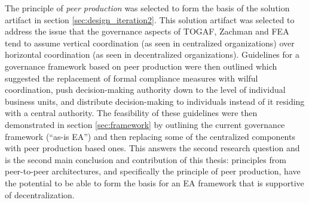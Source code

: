 The principle of \textit{peer production} was selected to form the basis of the solution artifact in section \ref{sec:design_iteration2}. This solution artifact was selected to address the issue that the governance aspects of TOGAF, Zachman and FEA tend to assume vertical coordination (as seen in centralized organizations) over horizontal coordination (as seen in decentralized organizations). Guidelines for a governance framework based on peer production were then outlined which suggested the replacement of formal compliance measures with wilful coordination, push decision-making authority down to the level of individual business units, and distribute decision-making to individuals instead of it residing with a central authority. The feasibility of these guidelines were then demonstrated in section \ref{sec:framework} by outlining the current governance framework (``as-is EA'') and then replacing some of the centralized components with peer production based ones. This answers the second research question and is the second main conclusion and contribution of this thesis: principles from peer-to-peer architectures, and specifically the principle of peer production, have the potential to be able to form the basis for an EA framework that is supportive of decentralization. 






